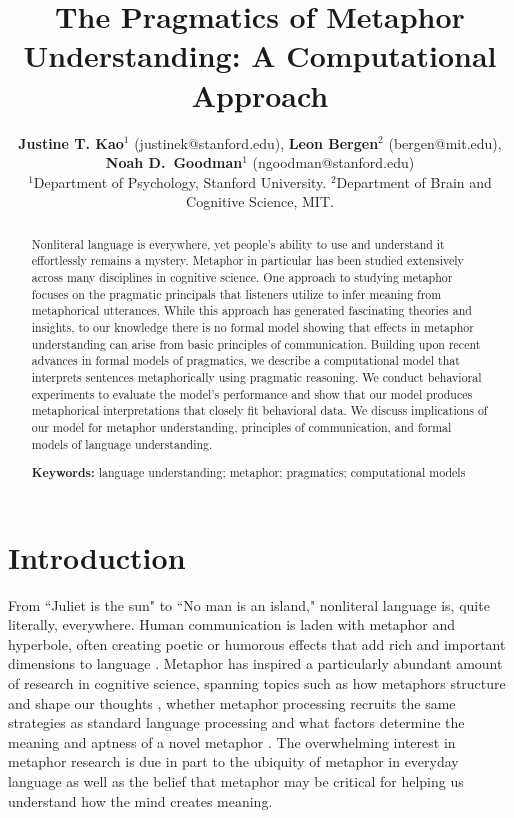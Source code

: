 \documentclass[10pt,letterpaper]{article}
\title{The Pragmatics of Metaphor Understanding: A Computational Approach}
\author{{\large {\bf Justine T. Kao$^1$} (justinek@stanford.edu)}, {\large {\bf Leon Bergen$^2$} (bergen@mit.edu)}, {\large {\bf Noah D.~Goodman$^1$} (ngoodman@stanford.edu)}\\
  $^1$Department of Psychology, Stanford University. $^2$Department of Brain and Cognitive Science, MIT. }
\begin{document}
\maketitle
\begin{abstract}
Nonliteral language is everywhere, yet people's ability to use and understand it effortlessly remains a mystery. Metaphor in particular has been studied extensively across many disciplines in cognitive science. One approach to studying metaphor focuses on the pragmatic principals that listeners utilize to infer meaning from metaphorical utterances. While this approach has generated fascinating theories and insights, to our knowledge there is no formal model showing that effects in metaphor understanding can arise from basic principles of communication. Building upon recent advances in formal models of pragmatics, we describe a computational model that interprets sentences metaphorically using pragmatic reasoning. We conduct behavioral experiments to evaluate the model's performance and show that our model produces metaphorical interpretations that closely fit behavioral data. We discuss implications of our model for metaphor understanding, principles of communication, and formal models of language understanding.

\textbf{Keywords:} 
language understanding; metaphor; pragmatics; computational models
\end{abstract}


\section{Introduction}
From ``Juliet is the sun" to ``No man is an island," nonliteral language is, quite literally, everywhere. Human communication is laden with metaphor and hyperbole, often creating poetic or humorous effects that add rich and important dimensions to language \cite{glucksberg2001understanding, pilkington2000poetic, lakoff2009more, roberts1994people, bergen2003cognitive}. Metaphor has inspired a particularly abundant amount of research in cognitive science, spanning topics such as how metaphors structure and shape our thoughts \cite{ortony1993metaphor, lakoff1993contemporary, thibodeau2011metaphors}, whether metaphor processing recruits the same strategies as standard language processing \cite{giora1997understanding, ortony1978interpreting, gibbs2002new, glucksberg1993metaphors} and what factors determine the meaning and aptness of a novel metaphor \cite{blasko1993effects, tourangeau1981aptness, kintsch2002metaphor}. The overwhelming interest in metaphor research is due in part to the ubiquity of metaphor in everyday language as well as the belief that metaphor may be critical for helping us understand how the mind creates meaning. 
\end{document}
